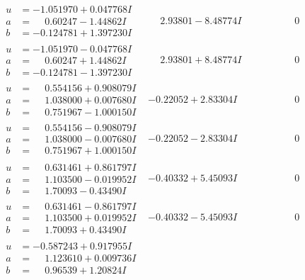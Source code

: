 \documentclass[1p]{elsarticle_modified}
\theoremstyle{definition}
\begin{document}
$$\begin{array}{c|c|c}
\begin{aligned}
u &= -1.051970 + 0.047768 I \\
a &= \phantom{-}0.60247 - 1.44862 I \\
b &= -0.124781 + 1.397230 I\end{aligned}
 & \phantom{-}2.93801 - 8.48774 I & \phantom{-0.000000 } 0 \\ \hline\begin{aligned}
u &= -1.051970 - 0.047768 I \\
a &= \phantom{-}0.60247 + 1.44862 I \\
b &= -0.124781 - 1.397230 I\end{aligned}
 & \phantom{-}2.93801 + 8.48774 I & \phantom{-0.000000 } 0 \\ \hline\begin{aligned}
u &= \phantom{-}0.554156 + 0.908079 I \\
a &= \phantom{-}1.038000 + 0.007680 I \\
b &= \phantom{-}0.751967 - 1.000150 I\end{aligned}
 & -0.22052 + 2.83304 I & \phantom{-0.000000 } 0 \\ \hline\begin{aligned}
u &= \phantom{-}0.554156 - 0.908079 I \\
a &= \phantom{-}1.038000 - 0.007680 I \\
b &= \phantom{-}0.751967 + 1.000150 I\end{aligned}
 & -0.22052 - 2.83304 I & \phantom{-0.000000 } 0 \\ \hline\begin{aligned}
u &= \phantom{-}0.631461 + 0.861797 I \\
a &= \phantom{-}1.103500 - 0.019952 I \\
b &= \phantom{-}1.70093 - 0.43490 I\end{aligned}
 & -0.40332 + 5.45093 I & \phantom{-0.000000 } 0 \\ \hline\begin{aligned}
u &= \phantom{-}0.631461 - 0.861797 I \\
a &= \phantom{-}1.103500 + 0.019952 I \\
b &= \phantom{-}1.70093 + 0.43490 I\end{aligned}
 & -0.40332 - 5.45093 I & \phantom{-0.000000 } 0 \\ \hline\begin{aligned}
u &= -0.587243 + 0.917955 I \\
a &= \phantom{-}1.123610 + 0.009736 I \\
b &= \phantom{-}0.96539 + 1.20824 I\end{aligned}

\end{array}$$
\end{document}
